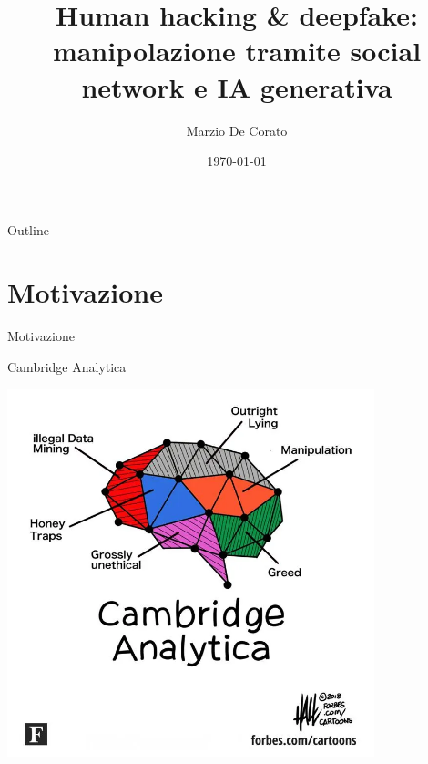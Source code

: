\documentclass[11pt]{beamer}
\title[Human hacking \& deepfake]{Human hacking \& deepfake: manipolazione tramite social network e IA generativa }}
\author{Marzio De Corato}
\date{\today}
\begin{document}
\begin{frame}
\vspace{+6.5 cm}  \titlepage
\end{frame}

\usebackgroundtemplate{ } 

\begin{frame}{Outline}
\setcounter{tocdepth}{1}
\begin{center}
\Large
  \tableofcontents
\end{center}
\end{frame}

\section{Motivazione}

\begin{frame}
\begin{center}
\Huge
Motivazione
\end{center}
\end{frame}

\begin{frame}{Cambridge Analytica \cite{CA_pic}}

\begin{center}
\includegraphics[width=0.8\textwidth]{Pic/CA_pic.png}
\end{center}

\end{frame}
\end{document}
